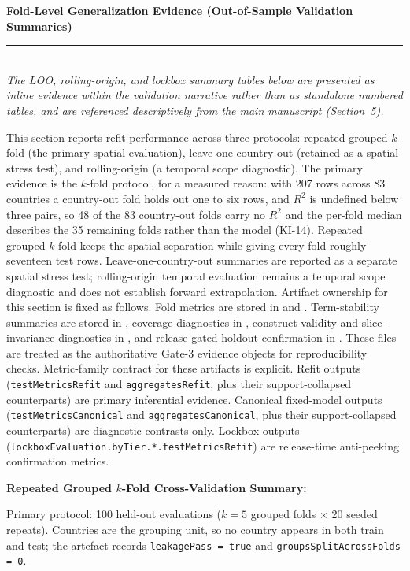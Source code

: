 \documentclass[11pt]{article}
\newcommand{\SubRule}{\color{black}\rule{\linewidth}{0.4pt}}
\newcommand{\Section}[1]{\noindent\textbf{#1}\\[-0.25em]\SubRule\\[0.1em]}
\begin{document}
\Section{Fold-Level Generalization Evidence (Out-of-Sample Validation Summaries)}

\noindent\textit{The LOO, rolling-origin, and lockbox summary tables below are presented as inline evidence within the validation narrative rather than as standalone numbered tables, and are referenced descriptively from the main manuscript (Section~5).}

\medskip

This section reports refit performance across three protocols: repeated grouped $k$-fold (the primary spatial evaluation), leave-one-country-out (retained as a spatial stress test), and rolling-origin (a temporal scope diagnostic). The primary evidence is the $k$-fold protocol, for a measured reason: with 207 rows across 83 countries a country-out fold holds out one to six rows, and $R^2$ is undefined below three pairs, so 48 of the 83 country-out folds carry no $R^2$ and the per-fold median describes the 35 remaining folds rather than the model (KI-14). Repeated grouped $k$-fold keeps the spatial separation while giving every fold roughly seventeen test rows. Leave-one-country-out summaries are reported as a separate spatial stress test; rolling-origin temporal evaluation remains a temporal scope diagnostic and does not establish forward extrapolation.
Artifact ownership for this section is fixed as follows. Fold metrics are stored in  and . Term-stability summaries are stored in , coverage diagnostics in , construct-validity and slice-invariance diagnostics in , and release-gated holdout confirmation in . These files are treated as the authoritative Gate-3 evidence objects for reproducibility checks.
Metric-family contract for these artifacts is explicit. Refit outputs (\texttt{testMetricsRefit} and \texttt{aggregatesRefit}, plus their support-collapsed counterparts) are primary inferential evidence. Canonical fixed-model outputs (\texttt{testMetricsCanonical} and \texttt{aggregatesCanonical}, plus their support-collapsed counterparts) are diagnostic contrasts only. Lockbox outputs (\texttt{lockboxEvaluation.byTier.*.}\allowbreak\texttt{testMetricsRefit}) are release-time anti-peeking confirmation metrics.

{\small\textbf{Repeated Grouped $k$-Fold Cross-Validation Summary:}}

\noindent Primary protocol: 100 held-out evaluations ($k=5$ grouped folds $\times$ 20 seeded repeats). Countries are the grouping unit, so no country appears in both train and test; the artefact records \texttt{leakagePass = true} and \texttt{groupsSplitAcrossFolds = 0}.
\end{document}
